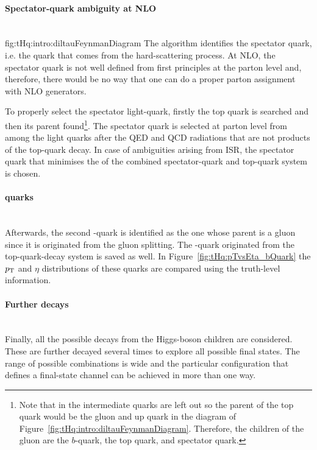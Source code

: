 \paragraph{Spectator-quark ambiguity at NLO}\mbox{}\\{fig:tHq:intro:diltauFeynmanDiagram}
The algorithm identifies the
spectator quark, i.e. the quark that comes from the hard-scattering process.
At NLO, the spectator quark is not well defined from first principles at the parton level 
and, therefore, there would be no way that one can do a proper parton assignment with NLO generators.

To properly select the spectator light-quark, firstly the top quark is searched and then its parent found\footnote{%
Note that in \PYTHIA the intermediate quarks are left out so the parent of the top quark would be the gluon and up quark in the diagram of Figure~\ref{fig:tHq:intro:diltauFeynmanDiagram}.
Therefore, the children of the gluon are the $b$-quark, the top quark, and spectator quark.}. 
The spectator quark is selected at parton level from among the light quarks after 
the QED and QCD radiations that are not products of the top-quark decay. 
In case of ambiguities arising from ISR, the spectator quark that minimises the \pT of 
the combined spectator-quark and top-quark system is chosen.


\paragraph{\Pbottom quarks}\mbox{}\\
 Afterwards, the second \Pbottom-quark is identified as the one whose parent
 is a gluon since it is originated from the gluon splitting. The \Pbottom-quark originated 
 from the top-quark-decay system is saved as well. In Figure~\ref{fig:tHq:pTvsEta_bQuark}
 the $p_{\text{T}}$ and $\eta$ distributions of these quarks are compared using the truth-level
 information.
 
 
\paragraph{Further decays}\mbox{}\\
Finally, all the possible decays from the Higgs-boson children are considered.
These are further decayed several times to explore all possible final states. %
The range of possible combinations is wide and the particular configuration that defines
a final-state channel can be achieved in more than one way. 

